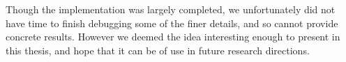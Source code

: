 Though the implementation was largely completed, we unfortunately did not have time to finish debugging some of the finer details, and so cannot provide concrete results. However we deemed the idea interesting enough to present in this thesis, and hope that it can be of use in future research directions.